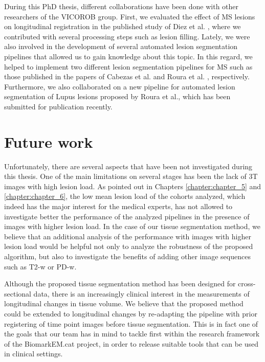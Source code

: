 \begin{itemize}
\end{itemize}

During this PhD thesis, different collaborations have been done with other researchers of the VICOROB group. First, we evaluated the effect of MS lesions on longitudinal registration in the published study of Diez et al. \cite{Diez2014}, where we contributed with several processing steps such as lesion filling. Lately, we were also involved in the development of several automated lesion segmentation pipelines that allowed us to gain knowledge about this topic. In this regard, we helped to implement two different lesion segmentation pipelines for MS such as those published in the papers of Cabezas et al. \cite{Cabezas2014b} and Roura et al. \cite{Roura2015}, respectively. Furthermore, we also collaborated on a new pipeline for automated lesion segmentation of Lupus lesions proposed by Roura et al., which has been submitted for publication recently. 


\section{Future work}

Unfortunately, there are several aspects that have been not investigated during this thesis. One of the main limitations on several stages has been the lack of 3T images with high lesion load. As pointed out in Chapters \ref{chapter:chapter_5} and \ref{chapter:chapter_6}, the low mean lesion load of the cohorts analyzed, which indeed has the major interest for the medical experts, has not allowed to investigate better the performance of the analyzed pipelines in the presence of images with higher lesion load. In the case of our tissue segmentation method, we believe that an additional analysis of the performance with images with higher lesion load would be helpful not only to analyze the robustness of the proposed algorithm, but also to investigate the benefits of adding other image sequences such as T2-w or PD-w. 

Although the proposed tissue segmentation method has been designed for cross-sectional data, there is an increasingly clinical interest in the measurements of longitudinal changes in tissue volume. We believe that the proposed method could be extended to longitudinal changes by re-adapting the pipeline with prior registering of time point images before tissue segmentation. This is in fact one of the goals that our team has in mind to tackle first within the research framework of the BiomarkEM.cat project, in order to release suitable tools that can be used in clinical settings. 

